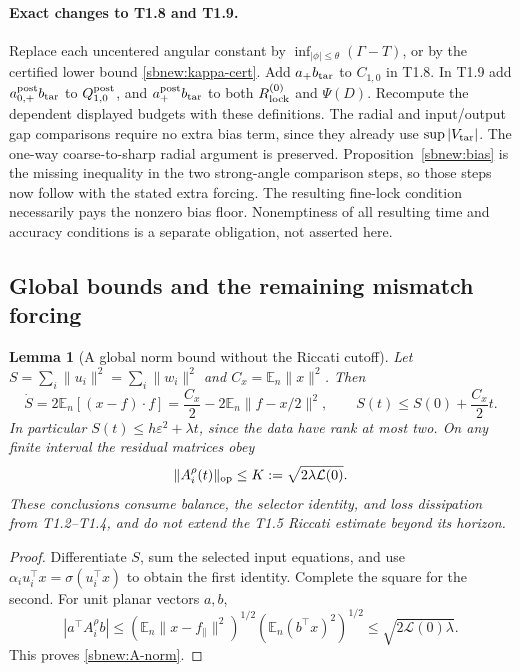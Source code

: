 \documentclass{article} %
\theoremstyle{plain}
\newtheorem{lemma}[theorem]{Lemma}
\theoremstyle{definition}
\theoremstyle{remark}
\begin{document}
\paragraph{Exact changes to T1.8 and T1.9.}
Replace each uncentered angular constant by
$\inf_{|\phi|\le\theta}(\Gamma-T)$, or by the certified lower bound
\eqref{sbnew:kappa-cert}. Add $a_+b_{\rm tar}$ to $C_{1,0}$ in T1.8.
In T1.9 add $a_{0,+}^{\rm post}b_{\rm tar}$ to
$Q_{1,0}^{\rm post}$, and $a_+^{\rm post}b_{\rm tar}$ to both
$R_{\rm lock}^{(0)}$ and $\Psi(D)$. Recompute the dependent displayed
budgets with these definitions. The radial and input/output gap
comparisons require no extra bias term, since they already use
$\sup|V_{\rm tar}|$. The one-way coarse-to-sharp radial argument is
preserved. Proposition~\ref{sbnew:bias} is the missing inequality in the
two strong-angle comparison steps, so those steps now follow with the
stated extra forcing. The resulting fine-lock condition necessarily pays
the nonzero bias floor. Nonemptiness of all resulting time and accuracy
conditions is a separate obligation, not asserted here.

\subsection{Global bounds and the remaining mismatch forcing}
\begin{lemma}[A global norm bound without the Riccati cutoff]
\label{sbnew:global}
Let $S=\sum_i\|u_i\|^2=\sum_i\|w_i\|^2$ and
$C_x=\mathbb E_n\|x\|^2$. Then
\begin{equation}\label{sbnew:global-S}
 \dot S=2\mathbb E_n[(x-f)\cdot f]
 =\frac{C_x}{2}-2\mathbb E_n\|f-x/2\|^2,
 \qquad S(t)\le S(0)+\frac{C_x}{2}t.
\end{equation}
In particular $S(t)\le h\varepsilon^2+\lambda t$, since the data have
rank at most two. On any finite interval the residual matrices obey
\begin{equation}\label{sbnew:A-norm}
 \|A_i^\rho(t)\|_{\rm op}\le
 K:=\sqrt{2\lambda\mathcal L(0)}.
\end{equation}
These conclusions consume balance, the selector identity, and loss
dissipation from T1.2--T1.4, and do not extend the T1.5 Riccati estimate
beyond its horizon.
\end{lemma}
\begin{proof}
Differentiate $S$, sum the selected input equations, and use
$\alpha_i u_i^\top x=\sigma(u_i^\top x)$ to obtain the first identity.
Complete the square for the second. For unit planar vectors $a,b$,
\[
 |a^\top A_i^\rho b|
 \le(\mathbb E_n\|x-f_\parallel\|^2)^{1/2}
       (\mathbb E_n(b^\top x)^2)^{1/2}
 \le\sqrt{2\mathcal L(0)\lambda}.
\]
This proves \eqref{sbnew:A-norm}.
\end{proof}
\end{document}
